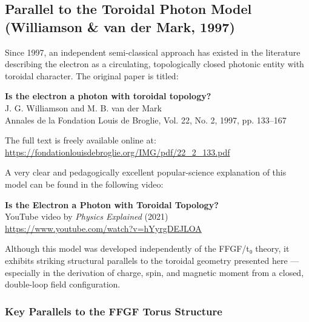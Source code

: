 \subsection{Parallel to the Toroidal Photon Model (Williamson \& van der Mark, 1997)}

Since 1997, an independent semi-classical approach has existed in the literature describing the electron as a circulating, topologically closed photonic entity with toroidal character. The original paper is titled:

\begin{center}
	\textbf{Is the electron a photon with toroidal topology?} \\
	J. G. Williamson and M. B. van der Mark \\
	Annales de la Fondation Louis de Broglie, Vol. 22, No. 2, 1997, pp. 133--167
\end{center}

The full text is freely available online at: \\
\url{https://fondationlouisdebroglie.org/IMG/pdf/22_2_133.pdf}

A very clear and pedagogically excellent popular-science explanation of this model can be found in the following video:

\begin{center}
	\textbf{Is the Electron a Photon with Toroidal Topology?} \\
	YouTube video by \emph{Physics Explained} (2021) \\
	\url{https://www.youtube.com/watch?v=hYyrgDEJLOA}
\end{center}

Although this model was developed independently of the FFGF/t₀ theory, it exhibits striking structural parallels to the toroidal geometry presented here — especially in the derivation of charge, spin, and magnetic moment from a closed, double-loop field configuration.

\subsubsection{Key Parallels to the FFGF Torus Structure}

